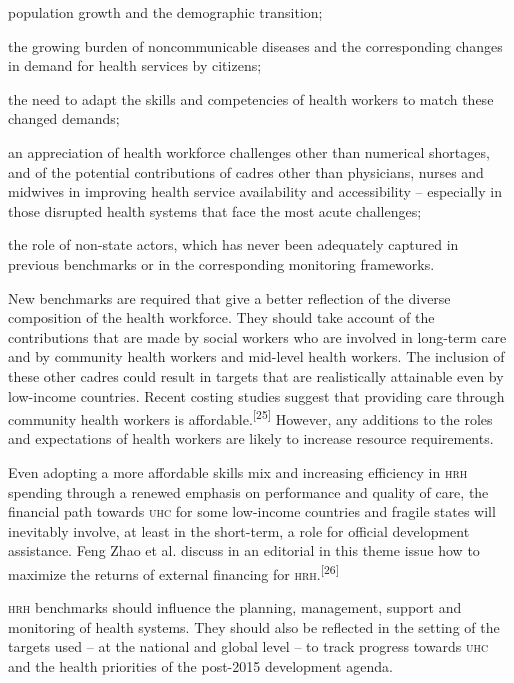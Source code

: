 \documentclass{article}
\begin{document}
population growth and the demographic transition;

the growing burden of noncommunicable diseases and the corresponding changes in
demand for health
services by citizens;

the need to adapt the skills and competencies of health workers to match these
changed
demands;

an appreciation of health workforce challenges other than numerical shortages,
and of the
potential contributions of cadres other than physicians, nurses and midwives in
improving health
service availability and accessibility – especially in those disrupted health
systems that
face the most acute challenges;

the role of non-state actors, which has never been adequately captured in
previous benchmarks or
in the corresponding monitoring frameworks.

New benchmarks are required that give a better reflection of the diverse
composition of the
health workforce. They should take account of the contributions that are made by
social workers who
are involved in long-term care and by community health workers and mid-level
health workers. The
inclusion of these other cadres could result in targets that are realistically
attainable even by
low-income countries. Recent costing studies suggest that providing care through
community health
workers is affordable.\textsuperscript{[}\textsuperscript{25}\textsuperscript{]}
However, any additions to
the roles and expectations of health workers are likely to increase resource
requirements.

Even adopting a more affordable skills mix and increasing efficiency in \textsc{hrh}
spending through a
renewed emphasis on performance and quality of care, the financial path towards
\textsc{uhc} for some
low-income countries and fragile states will inevitably involve, at least in the
short-term, a role
for official development assistance. Feng Zhao et al. discuss in an editorial in
this theme issue
how to maximize the returns of external financing for
\textsc{hrh}.\textsuperscript{[}\textsuperscript{26}\textsuperscript{]}

\textsc{hrh} benchmarks should influence the planning, management, support and monitoring
of health
systems. They should also be reflected in the setting of the targets used – at
the national
and global level – to track progress towards \textsc{uhc} and the health priorities of
the post-2015
development agenda.
\end{document}
